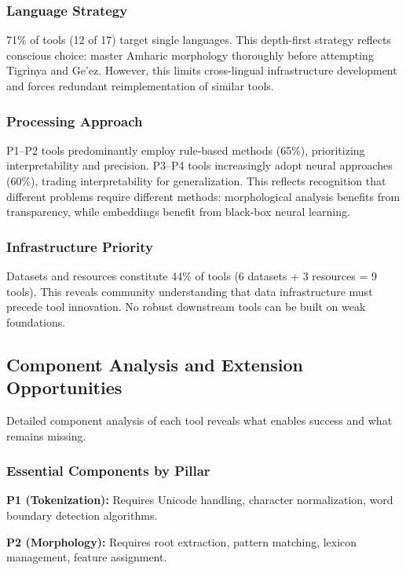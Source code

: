 \documentclass[12pt,a4paper]{article}
\theoremstyle{plain}
\theoremstyle{definition}
\begin{document}
\subsubsection{Language Strategy}

71\% of tools (12 of 17) target single languages. This depth-first strategy reflects conscious choice: master Amharic morphology thoroughly before attempting Tigrinya and Ge'ez. However, this limits cross-lingual infrastructure development and forces redundant reimplementation of similar tools.

\subsubsection{Processing Approach}

P1--P2 tools predominantly employ rule-based methods (65\%), prioritizing interpretability and precision. P3--P4 tools increasingly adopt neural approaches (60\%), trading interpretability for generalization. This reflects recognition that different problems require different methods: morphological analysis benefits from transparency, while embeddings benefit from black-box neural learning.

\subsubsection{Infrastructure Priority}

Datasets and resources constitute 44\% of tools (6 datasets + 3 resources = 9 tools). This reveals community understanding that data infrastructure must precede tool innovation. No robust downstream tools can be built on weak foundations.

\subsection{Component Analysis and Extension Opportunities}
\label{subsec:ablations}

Detailed component analysis of each tool reveals what enables success and what remains missing.

\subsubsection{Essential Components by Pillar}

\textbf{P1 (Tokenization):} Requires Unicode handling, character normalization, word boundary detection algorithms.

\textbf{P2 (Morphology):} Requires root extraction, pattern matching, lexicon management, feature assignment.
\end{document}
